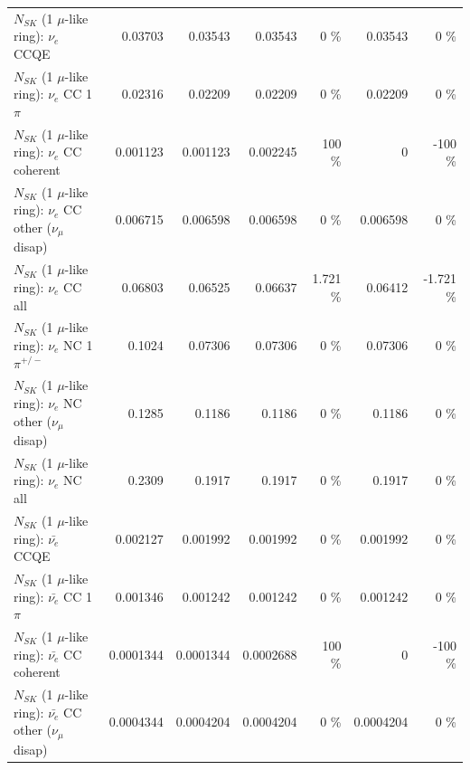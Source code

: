 \begin{table}
\begin{tabular}{| l | r | r | r  r | r  r |}
\hline
\hline
\hline
                                      $N_{SK}$ (1 $\mu$-like ring): $\nu_e$ CCQE &         0.03703 &         0.03543 &         0.03543 &        0 \%  &         0.03543 &        0 \%  \\ 
                                 $N_{SK}$ (1 $\mu$-like ring): $\nu_e$ CC 1$\pi$ &         0.02316 &         0.02209 &         0.02209 &        0 \%  &         0.02209 &        0 \%  \\ 
                               $N_{SK}$ (1 $\mu$-like ring): $\nu_e$ CC coherent &        0.001123 &        0.001123 &        0.002245 &      100 \%  &               0 &     -100 \%  \\ 
                $N_{SK}$ (1 $\mu$-like ring): $\nu_e$ CC other ($\nu_\mu$ disap) &        0.006715 &        0.006598 &        0.006598 &        0 \%  &        0.006598 &        0 \%  \\ 
                                  $N_{SK}$ (1 $\mu$-like ring): $\nu_{e}$ CC all &         0.06803 &         0.06525 &         0.06637 &    1.721 \%  &         0.06412 &   -1.721 \%  \\ 
\hline
                           $N_{SK}$ (1 $\mu$-like ring): $\nu_e$ NC 1$\pi^{+/-}$ &          0.1024 &         0.07306 &         0.07306 &        0 \%  &         0.07306 &        0 \%  \\ 
                $N_{SK}$ (1 $\mu$-like ring): $\nu_e$ NC other ($\nu_\mu$ disap) &          0.1285 &          0.1186 &          0.1186 &        0 \%  &          0.1186 &        0 \%  \\ 
                                  $N_{SK}$ (1 $\mu$-like ring): $\nu_{e}$ NC all &          0.2309 &          0.1917 &          0.1917 &        0 \%  &          0.1917 &        0 \%  \\ 
\hline
\hline
\hline
                                $N_{SK}$ (1 $\mu$-like ring): $\bar{\nu_e}$ CCQE &        0.002127 &        0.001992 &        0.001992 &        0 \%  &        0.001992 &        0 \%  \\ 
                           $N_{SK}$ (1 $\mu$-like ring): $\bar{\nu_e}$ CC 1$\pi$ &        0.001346 &        0.001242 &        0.001242 &        0 \%  &        0.001242 &        0 \%  \\ 
                         $N_{SK}$ (1 $\mu$-like ring): $\bar{\nu_e}$ CC coherent &       0.0001344 &       0.0001344 &       0.0002688 &      100 \%  &               0 &     -100 \%  \\ 
          $N_{SK}$ (1 $\mu$-like ring): $\bar{\nu_e}$ CC other ($\nu_\mu$ disap) &       0.0004344 &       0.0004204 &       0.0004204 &        0 \%  &       0.0004204 &        0 \%  \\ 

\end{tabular}
\end{table}
